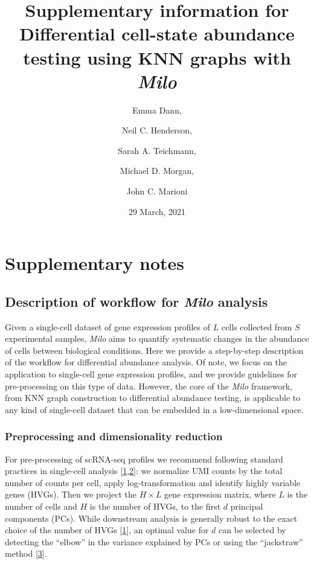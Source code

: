 \documentclass[
]{article}
\title{Supplementary information for
\textbf{Differential cell-state abundance testing using KNN graphs with \emph{Milo}}}
\author{Emma Dann, \and Neil C. Henderson, \and Sarah A. Teichmann, \and Michael D. Morgan, \and John C. Marioni}
\date{29 March, 2021}
\begin{document}
\maketitle

{
\setcounter{tocdepth}{3}
\tableofcontents
}
\renewcommand{\figurename}{Supplementary Figure}

\newpage

\hypertarget{supplementary-notes}{%
\section{Supplementary notes}\label{supplementary-notes}}

\hypertarget{description-of-workflow-for-milo-analysis}{%
\subsection{\texorpdfstring{Description of workflow for \emph{Milo} analysis}{Description of workflow for Milo analysis}}\label{description-of-workflow-for-milo-analysis}}

Given a single-cell dataset of gene expression profiles of \(L\) cells collected from \(S\) experimental samples, \emph{Milo} aims to quantify systematic changes in the abundance of cells between biological conditions. Here we provide a step-by-step description of the workflow for differential abundance analysis. Of note, we focus on the application to single-cell gene expression profiles, and we provide guidelines for pre-processing on this type of data. However, the core of the \emph{Milo} framework, from KNN graph construction to differential abundance testing, is applicable to any kind of single-cell dataset that can be embedded in a low-dimensional space.

\hypertarget{pp}{%
\subsubsection{Preprocessing and dimensionality reduction}\label{pp}}

For pre-processing of scRNA-seq profiles we recommend following standard practices in single-cell analysis {[}\protect\hyperlink{ref-lueckenCurrentBestPractices2019}{1},\protect\hyperlink{ref-amezquitaOrchestratingSinglecellAnalysis2020}{2}{]}: we normalize UMI counts by the total number of counts per cell, apply log-transformation and identify highly variable genes (HVGs). Then we project the \(H \times L\) gene expression matrix, where \(L\) is the number of cells and \(H\) is the number of HVGs, to the first \(d\) principal components (PCs). While downstream analysis is generally robust to the exact choice of the number of HVGs {[}\protect\hyperlink{ref-lueckenCurrentBestPractices2019}{1}{]}, an optimal value for \(d\) can be selected by detecting the ``elbow'' in the variance explained by PCs or using the ``jackstraw'' method {[}\protect\hyperlink{ref-chungStatisticalSignificanceVariables2015}{3}{]}.
\end{document}

